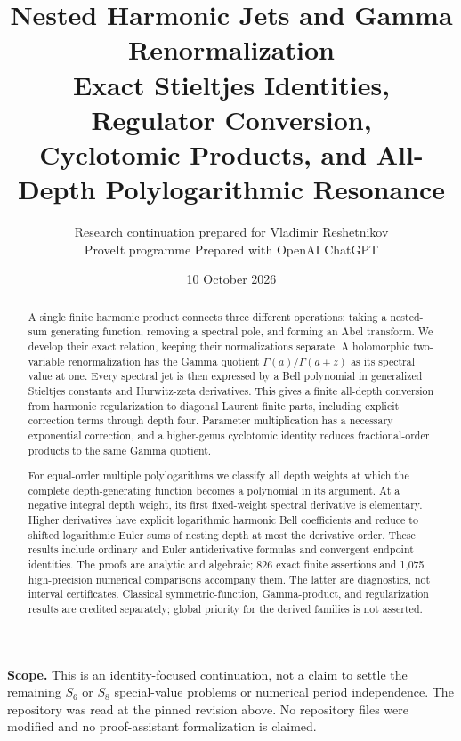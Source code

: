 \documentclass[11pt]{article}
\title{\textbf{Nested Harmonic Jets and Gamma Renormalization}\\[5pt]
\large Exact Stieltjes Identities, Regulator Conversion,\\
Cyclotomic Products, and All-Depth Polylogarithmic Resonance}
\author{Research continuation prepared for Vladimir Reshetnikov\\
\small ProveIt programme \quad\textbullet\quad Prepared with OpenAI ChatGPT}
\date{10 October 2026}
\numberwithin{equation}{section}
\theoremstyle{definition}\newtheorem{definition}[theorem]{Definition}
\theoremstyle{remark}\newtheorem{remark}[theorem]{Remark}
\begin{document}
\maketitle
\begin{abstract}
A single finite harmonic product connects three different operations: taking a
nested-sum generating function, removing a spectral pole, and forming an Abel
transform. We develop their exact relation, keeping their normalizations
separate. A holomorphic two-variable renormalization has the Gamma quotient
$\Gamma(a)/\Gamma(a+z)$ as its spectral value at one. Every spectral jet is
then expressed by a Bell polynomial in generalized Stieltjes constants and
Hurwitz-zeta derivatives. This gives a finite all-depth conversion from
harmonic regularization to diagonal Laurent finite parts, including explicit
correction terms through depth four. Parameter multiplication has a necessary
exponential correction, and a higher-genus cyclotomic identity reduces
fractional-order products to the same Gamma quotient.

For equal-order multiple polylogarithms we classify all depth weights at which
the complete depth-generating function becomes a polynomial in its argument.
At a negative integral depth weight, its first fixed-weight spectral
derivative is elementary. Higher derivatives have explicit logarithmic
harmonic Bell coefficients and reduce to shifted logarithmic Euler sums of
nesting depth at most the derivative order. These results include ordinary
and Euler antiderivative formulas and convergent endpoint identities.
The proofs are analytic and algebraic; 826 exact finite assertions and
1,075 high-precision numerical comparisons accompany them. The latter are
diagnostics, not interval certificates. Classical symmetric-function,
Gamma-product, and regularization results are credited separately; global
priority for the derived families is not asserted.
\end{abstract}
\vspace{4pt}
\noindent\textbf{Scope.} This is an identity-focused continuation, not a claim to
settle the remaining $S_6$ or $S_8$ special-value problems or numerical period
independence. The repository was read at the pinned revision above. No
repository files were modified and no proof-assistant formalization is claimed.
\clearpage
\tableofcontents
\clearpage
\end{document}
